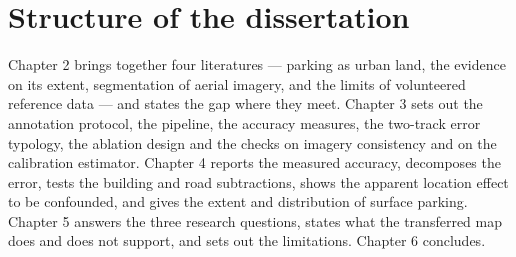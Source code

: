 \hypertarget{structure-of-the-dissertation}{%
\section{Structure of the dissertation}\label{structure-of-the-dissertation}}

Chapter 2 brings together four literatures --- parking as urban land, the evidence on its extent, segmentation of aerial imagery, and the limits of volunteered reference data --- and states the gap where they meet. Chapter 3 sets out the annotation protocol, the pipeline, the accuracy measures, the two-track error typology, the ablation design and the checks on imagery consistency and on the calibration estimator. Chapter 4 reports the measured accuracy, decomposes the error, tests the building and road subtractions, shows the apparent location effect to be confounded, and gives the extent and distribution of surface parking. Chapter 5 answers the three research questions, states what the transferred map does and does not support, and sets out the limitations. Chapter 6 concludes.
